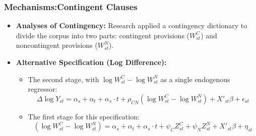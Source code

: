 \documentclass{beamer}
\begin{document}
\begin{frame}
    \frametitle{Mechanisms:Contingent Clauses}
    \footnotesize
    \begin{itemize}
        \item \textbf{Analyses of Contingency:} Research applied a contingency dictionary to divide the corpus into two parts: contingent provisions ($W_{st}^C$) and noncontingent provisions ($W_{st}^N$).
   \item \textbf{Alternative Specification (Log Difference):}
        \begin{itemize}
            \item The second stage, with $\log W_{st}^C - \log W_{st}^N$ as a single endogenous regressor:
            \begin{equation*}
                \Delta \log Y_{st} = \alpha_s + \alpha_t + \alpha_s \cdot t + \rho_{CN} (\log W_{st}^C - \log W_{st}^N) + X'_{st}\beta + \epsilon_{st}
            \end{equation*}
            \item The first stage for this specification:
            \begin{equation*}
                (\log W_{st}^C - \log W_{st}^N) = \alpha_s + \alpha_t + \alpha_s \cdot t + \psi_C Z_{st}^C + \psi_N Z_{st}^N + X'_{st}\beta + \eta_{st}
            \end{equation*}
        \end{itemize}
    \end{itemize}
\end{frame}
\end{document}
